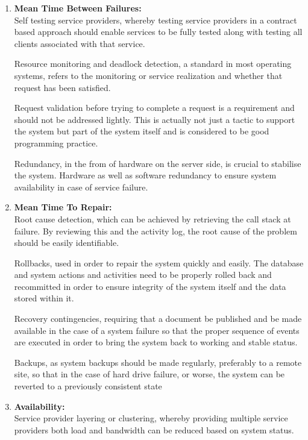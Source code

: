 \documentclass{article}
\begin{document}
			\begin{enumerate}

				\item{\bfseries Mean Time Between Failures:}\\
				
				Self testing service providers, whereby testing service providers in a contract based approach should enable services to be fully tested along with testing all clients associated with that service.

				Resource monitoring and deadlock detection, a standard in most operating systems, refers to the monitoring or service realization and whether that request has been satisfied.

				Request validation before trying to complete a request is a requirement and should not be addressed lightly. This is actually not just a tactic to support the system but part of the system itself and is considered to be good programming practice.

				Redundancy, in the from of hardware on the server side, is crucial to stabilise the system. Hardware as well as software redundancy to ensure system availability in case of service failure.

				\item{\bfseries Mean Time To Repair:}\\
				
				Root cause detection, which can be achieved by retrieving the call stack at failure. By reviewing this and the activity log, the root cause of the problem should be easily identifiable.

				Rollbacks, used in order to repair the system quickly and easily. The database and system actions and activities need to be properly rolled back and recommitted in order to ensure integrity of the system itself and the data stored within it.

				Recovery contingencies, requiring that a document be published and be made available in the case of a system failure so that the proper sequence of events are executed in order to bring the system back to working and stable status.

				Backups, as system backups should be made regularly, preferably to a remote site, so that in the case of hard drive failure, or worse, the system can be reverted to a previously consistent state

				\item{\bfseries Availability:}\\
				
				Service provider layering or clustering, whereby providing multiple service providers both load and bandwidth can be reduced based on system status.

			\end{enumerate}
\end{document}
